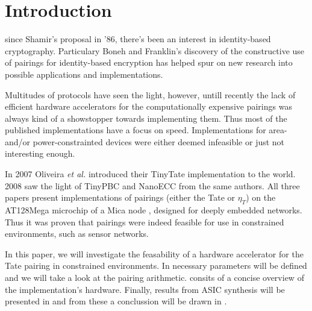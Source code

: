 \section{Introduction\label{section-introduction}}

 since Shamir's proposal \cite{shamir} in '86, there's been an interest in identity-based cryptography. Particulary Boneh and Franklin's \cite{boneh} discovery of the constructive use of pairings for identity-based encryption has helped spur on new research into possible applications and implementations.

Multitudes of protocols have seen the light, however, untill recently the lack of efficient hardware accelerators for the computationally expensive pairings was always kind of a showstopper towards implementing them. Thus most of the published implementations have a focus on speed. Implementations for area- and/or power-constrainted devices were either deemed infeasible or just not interesting enough. 

In 2007 Oliveira \emph{et al.} introduced their TinyTate \cite{tinytate} implementation to the world. 2008 saw the light of TinyPBC \cite{tinypbc} and NanoECC \cite{nanoecc} from the same authors. All three papers present implementations of pairings (either the Tate or $\eta_T$) on the AT128Mega microchip of a Mica node \cite{mica}, designed for deeply embedded networks. Thus it was proven that pairings were indeed feasible for use in constrained environments, such as sensor networks.

In this paper, we will investigate the feasability of a hardware accelerator for the Tate pairing in constrained environments. In  necessary parameters will be defined and we will take a look at the pairing arithmetic.  consits of a concise overview of the implementation's hardware. Finally, results from ASIC synthesis will be presented in  and from these a conclussion will be drawn in .
